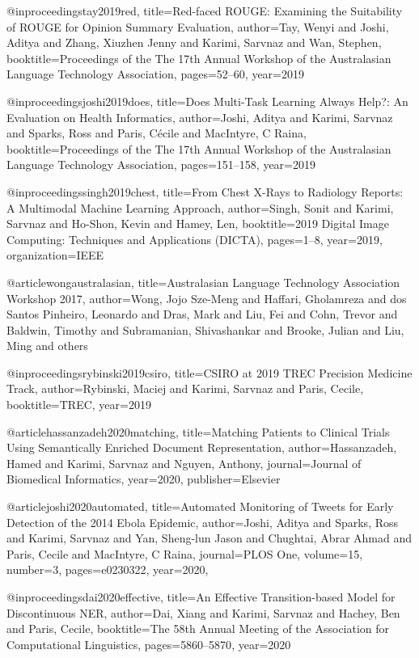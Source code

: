 @inproceedings{tay2019red,
  title={Red-faced ROUGE: Examining the Suitability of ROUGE for Opinion Summary Evaluation},
  author={Tay, Wenyi and Joshi, Aditya and Zhang, Xiuzhen Jenny and Karimi, Sarvnaz and Wan, Stephen},
  booktitle={Proceedings of the The 17th Annual Workshop of the Australasian Language Technology Association},
  pages={52--60},
  year={2019}
}

@inproceedings{joshi2019does,
  title={Does Multi-Task Learning Always Help?: An Evaluation on Health Informatics},
  author={Joshi, Aditya and Karimi, Sarvnaz and Sparks, Ross and Paris, C{\'e}cile and MacIntyre, C Raina},
  booktitle={Proceedings of the The 17th Annual Workshop of the Australasian Language Technology Association},
  pages={151--158},
  year={2019}
}

@inproceedings{singh2019chest,
  title={From Chest X-Rays to Radiology Reports: A Multimodal Machine Learning Approach},
  author={Singh, Sonit and Karimi, Sarvnaz and Ho-Shon, Kevin and Hamey, Len},
  booktitle={2019 Digital Image Computing: Techniques and Applications (DICTA)},
  pages={1--8},
  year={2019},
  organization={IEEE}
}

@article{wongaustralasian,
  title={Australasian Language Technology Association Workshop 2017},
  author={Wong, Jojo Sze-Meng and Haffari, Gholamreza and dos Santos Pinheiro, Leonardo and Dras, Mark and Liu, Fei and Cohn, Trevor and Baldwin, Timothy and Subramanian, Shivashankar and Brooke, Julian and Liu, Ming and others}
}

@inproceedings{rybinski2019csiro,
  title={CSIRO at 2019 TREC Precision Medicine Track},
  author={Rybinski, Maciej and Karimi, Sarvnaz and Paris, Cecile},
  booktitle={TREC},
  year={2019}
}

@article{hassanzadeh2020matching,
  title={Matching Patients to Clinical Trials Using Semantically Enriched Document Representation},
  author={Hassanzadeh, Hamed and Karimi, Sarvnaz and Nguyen, Anthony},
  journal={Journal of Biomedical Informatics},
  year={2020},
  publisher={Elsevier}
}

@article{joshi2020automated,
  title={Automated Monitoring of Tweets for Early Detection of the 2014 Ebola Epidemic},
  author={Joshi, Aditya and Sparks, Ross and Karimi, Sarvnaz and Yan, Sheng-lun Jason and Chughtai, Abrar Ahmad and Paris, Cecile and MacIntyre, C Raina},
  journal={PLOS One},
  volume={15},
  number={3},
  pages={e0230322},
  year={2020},
}

@inproceedings{dai2020effective,
  title={An Effective Transition-based Model for Discontinuous NER},
  author={Dai, Xiang and Karimi, Sarvnaz and Hachey, Ben and Paris, Cecile},
  booktitle={The 58th Annual Meeting of the Association for Computational Linguistics},
  pages={5860--5870},
  year={2020}
}

